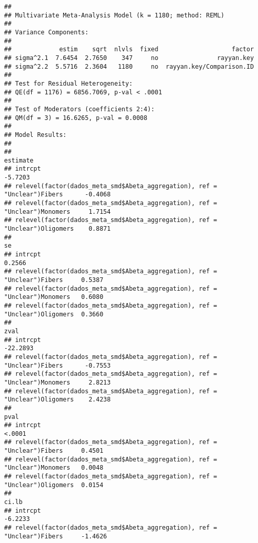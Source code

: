 \documentclass[
]{article}
\begin{document}
\begin{verbatim}
## 
## Multivariate Meta-Analysis Model (k = 1180; method: REML)
## 
## Variance Components:
## 
##             estim    sqrt  nlvls  fixed                    factor 
## sigma^2.1  7.6454  2.7650    347     no                rayyan.key 
## sigma^2.2  5.5716  2.3604   1180     no  rayyan.key/Comparison.ID 
## 
## Test for Residual Heterogeneity:
## QE(df = 1176) = 6856.7069, p-val < .0001
## 
## Test of Moderators (coefficients 2:4):
## QM(df = 3) = 16.6265, p-val = 0.0008
## 
## Model Results:
## 
##                                                                              estimate 
## intrcpt                                                                       -5.7203 
## relevel(factor(dados_meta_smd$Abeta_aggregation), ref = "Unclear")Fibers      -0.4068 
## relevel(factor(dados_meta_smd$Abeta_aggregation), ref = "Unclear")Monomers     1.7154 
## relevel(factor(dados_meta_smd$Abeta_aggregation), ref = "Unclear")Oligomers    0.8871 
##                                                                                  se 
## intrcpt                                                                      0.2566 
## relevel(factor(dados_meta_smd$Abeta_aggregation), ref = "Unclear")Fibers     0.5387 
## relevel(factor(dados_meta_smd$Abeta_aggregation), ref = "Unclear")Monomers   0.6080 
## relevel(factor(dados_meta_smd$Abeta_aggregation), ref = "Unclear")Oligomers  0.3660 
##                                                                                  zval 
## intrcpt                                                                      -22.2893 
## relevel(factor(dados_meta_smd$Abeta_aggregation), ref = "Unclear")Fibers      -0.7553 
## relevel(factor(dados_meta_smd$Abeta_aggregation), ref = "Unclear")Monomers     2.8213 
## relevel(factor(dados_meta_smd$Abeta_aggregation), ref = "Unclear")Oligomers    2.4238 
##                                                                                pval 
## intrcpt                                                                      <.0001 
## relevel(factor(dados_meta_smd$Abeta_aggregation), ref = "Unclear")Fibers     0.4501 
## relevel(factor(dados_meta_smd$Abeta_aggregation), ref = "Unclear")Monomers   0.0048 
## relevel(factor(dados_meta_smd$Abeta_aggregation), ref = "Unclear")Oligomers  0.0154 
##                                                                                ci.lb 
## intrcpt                                                                      -6.2233 
## relevel(factor(dados_meta_smd$Abeta_aggregation), ref = "Unclear")Fibers     -1.4626 

\end{verbatim}
\end{document}
